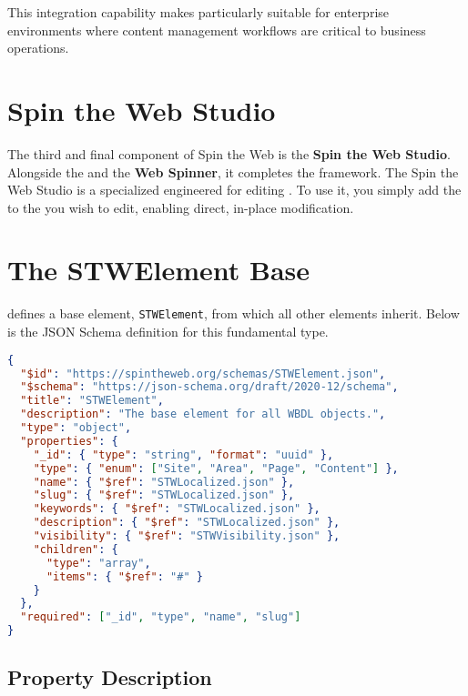 This integration capability makes \wbdl{} particularly suitable for enterprise environments where content management workflows are critical to business operations.

\section{Spin the Web Studio}
\label{sec:studio}

The third and final component of Spin the Web is the \textbf{Spin the Web Studio}. Alongside the \textbf{\wbdl{}} and the \textbf{Web Spinner}, it completes the framework. The Spin the Web Studio is a specialized \webbaselet{} engineered for editing . To use it, you simply add the \webbaselet{} to the \webbase{} you wish to edit, enabling direct, in-place modification.

\section{The STWElement Base}
\label{sec:stwelement-base}

\wbdl{} defines a base element, \texttt{STWElement}, from which all other elements inherit. Below is the JSON Schema definition for this fundamental type.

\begin{lstlisting}[language=JSON,caption={STWElement Base Schema Definition}]
{
  "$id": "https://spintheweb.org/schemas/STWElement.json",
  "$schema": "https://json-schema.org/draft/2020-12/schema",
  "title": "STWElement",
  "description": "The base element for all WBDL objects.",
  "type": "object",
  "properties": {
    "_id": { "type": "string", "format": "uuid" },
    "type": { "enum": ["Site", "Area", "Page", "Content"] },
    "name": { "$ref": "STWLocalized.json" },
    "slug": { "$ref": "STWLocalized.json" },
    "keywords": { "$ref": "STWLocalized.json" },
    "description": { "$ref": "STWLocalized.json" },
    "visibility": { "$ref": "STWVisibility.json" },
    "children": {
      "type": "array",
      "items": { "$ref": "#" }
    }
  },
  "required": ["_id", "type", "name", "slug"]
}
\end{lstlisting}

\subsection{Property Description}

